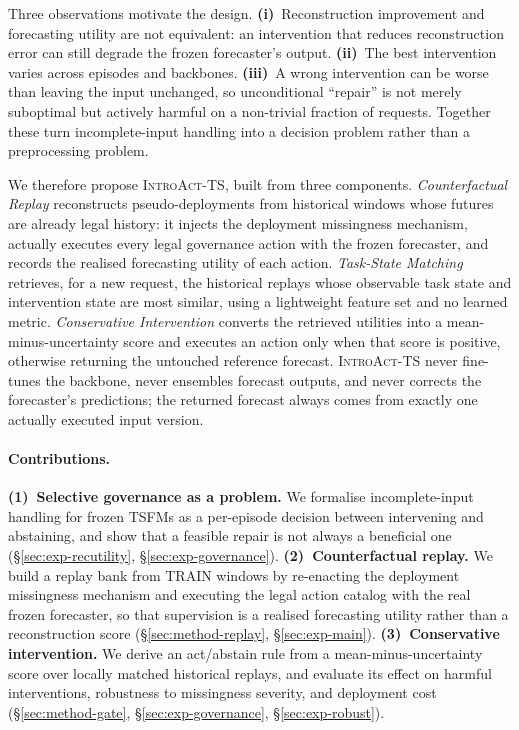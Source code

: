 \documentclass{article}
\newcommand{\introact}{\textsc{IntroAct-TS}}
\newcommand{\tsfm}{TSFM}
\begin{document}
Three observations motivate the design. \textbf{(i)}~Reconstruction improvement and
forecasting utility are not equivalent: an intervention that reduces reconstruction error
can still degrade the frozen forecaster's output. \textbf{(ii)}~The best intervention
varies across episodes and backbones. \textbf{(iii)}~A wrong intervention can be worse than
leaving the input unchanged, so unconditional ``repair'' is not merely suboptimal but
actively harmful on a non-trivial fraction of requests. Together these turn incomplete-input
handling into a decision problem rather than a preprocessing problem.

We therefore propose \introact{}, built from three components.
\emph{Counterfactual Replay} reconstructs pseudo-deployments from historical windows
whose futures are already legal history: it injects the deployment missingness
mechanism, actually executes every legal governance action with the frozen forecaster,
and records the realised forecasting utility of each action. \emph{Task-State Matching}
retrieves, for a new request, the historical replays whose observable task state and
intervention state are most similar, using a lightweight feature set and no learned
metric. \emph{Conservative Intervention} converts the retrieved utilities into a
mean-minus-uncertainty score and executes an action only when that score is positive,
otherwise returning the untouched reference forecast. \introact{} never fine-tunes the
backbone, never ensembles forecast outputs, and never corrects the forecaster's
predictions; the returned forecast always comes from exactly one actually executed input
version.

\paragraph{Contributions.}
\textbf{(1)~Selective governance as a problem.} We formalise incomplete-input handling for
frozen \tsfm{}s as a per-episode decision between intervening and abstaining, and show that
a feasible repair is not always a beneficial one (\S\ref{sec:exp-recutility},
\S\ref{sec:exp-governance}). \textbf{(2)~Counterfactual replay.} We build a replay bank
from TRAIN windows by re-enacting the deployment missingness mechanism and executing the
legal action catalog with the real frozen forecaster, so that supervision is a realised
forecasting utility rather than a reconstruction score (\S\ref{sec:method-replay},
\S\ref{sec:exp-main}). \textbf{(3)~Conservative intervention.} We derive an act/abstain
rule from a mean-minus-uncertainty score over locally matched historical replays, and
evaluate its effect on harmful interventions, robustness to missingness severity, and
deployment cost (\S\ref{sec:method-gate}, \S\ref{sec:exp-governance},
\S\ref{sec:exp-robust}).
\end{document}
